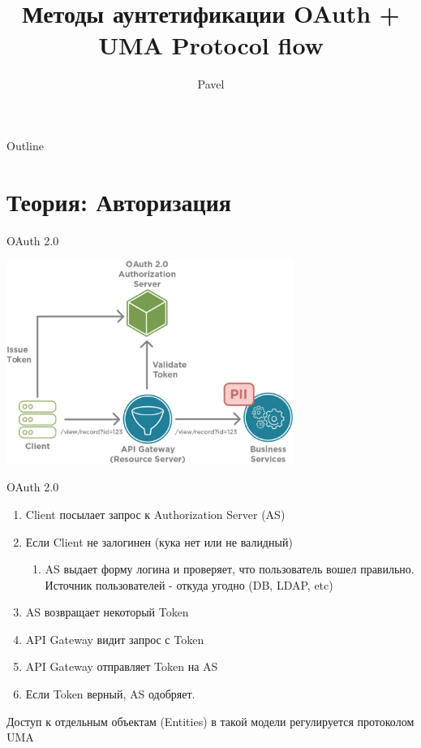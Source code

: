 \documentclass[presentation]{beamer}
\author{Pavel}
\date{}
\title{Методы аунтетификации OAuth + UMA Protocol flow}
\begin{document}
\maketitle
\begin{frame}{Outline}
\tableofcontents
\end{frame}


\section{Теория: Авторизация}
\label{sec:org36890f9}

\begin{frame}[label={sec:orgf28ee89}]{OAuth 2.0}
\begin{center}
\includegraphics[width=0.7\textwidth]{./img/oauth2.jpg}
\end{center}
\end{frame}

\begin{frame}[label={sec:org509c52e}]{OAuth 2.0}
\begin{enumerate}
\item Client посылает запрос к Authorization Server (AS)
\item Если Client не залогинен (кука нет или не валидный)
\begin{enumerate}
\item AS выдает форму логина и проверяет, что пользователь вошел правильно.
Источник пользователей - откуда угодно (DB, LDAP, etc)
\end{enumerate}
\item AS возвращает некоторый Token
\item API Gateway видит запрос с Token
\item API Gateway отправляет Token на AS
\item Если Token верный, AS одобряет.
\end{enumerate}


Доступ к отдельным объектам (Entities) в такой модели регулируется протоколом UMA
\end{frame}
\end{document}

